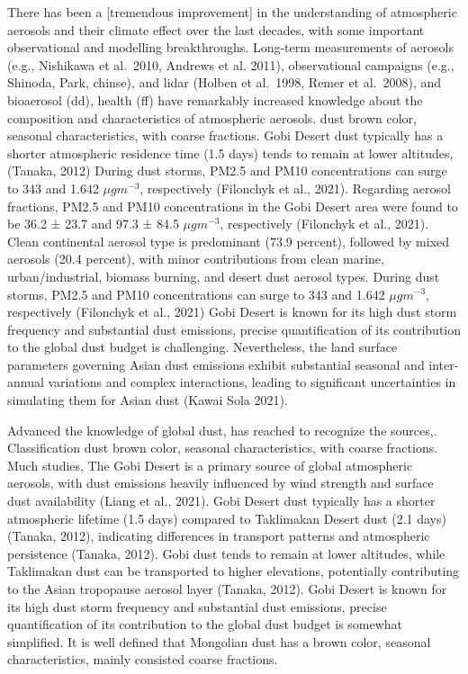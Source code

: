 \documentclass[
  11pt,
]{article}
\begin{document}
There has been a {[}tremendous improvement{]} in the understanding of
atmospheric aerosols and their climate effect over the last decades,
with some important observational and modelling breakthroughs. Long-term
measurements of aerosols (e.g., Nishikawa et al.~2010, Andrews et al.
2011), observational campaigns (e.g., Shinoda, Park, chinse), and lidar
(Holben et al.~1998, Remer et al.~2008), and bioaerosol (dd), health
(ff) have remarkably increased knowledge about the composition and
characteristics of atmospheric aerosols. dust brown color, seasonal
characteristics, with coarse fractions. Gobi Desert dust typically has a
shorter atmospheric residence time (1.5 days) tends to remain at lower
altitudes, (Tanaka, 2012) During dust storms, PM2.5 and PM10
concentrations can surge to 343 and 1.642 \(\mu g m^{-3}\), respectively
(Filonchyk et al., 2021). Regarding aerosol fractions, PM2.5 and PM10
concentrations in the Gobi Desert area were found to be 36.2 ± 23.7 and
97.3 ± 84.5 \(\mu g m^{-3}\), respectively (Filonchyk et al., 2021).
Clean continental aerosol type is predominant (73.9 percent), followed
by mixed aerosols (20.4 percent), with minor contributions from clean
marine, urban/industrial, biomass burning, and desert dust aerosol
types. During dust storms, PM2.5 and PM10 concentrations can surge to
343 and 1.642 \(\mu g m^{-3}\), respectively (Filonchyk et al., 2021)
Gobi Desert is known for its high dust storm frequency and substantial
dust emissions, precise quantification of its contribution to the global
dust budget is challenging. Nevertheless, the land surface parameters
governing Asian dust emissions exhibit substantial seasonal and
inter-annual variations and complex interactions, leading to significant
uncertainties in simulating them for Asian dust (Kawai Sola 2021).

Advanced the knowledge of global dust, has reached to recognize the
sources,. Classification dust brown color, seasonal characteristics,
with coarse fractions. Much studies, The Gobi Desert is a primary source
of global atmospheric aerosols, with dust emissions heavily influenced
by wind strength and surface dust availability (Liang et al., 2021).
Gobi Desert dust typically has a shorter atmospheric lifetime (1.5 days)
compared to Taklimakan Desert dust (2.1 days) (Tanaka, 2012), indicating
differences in transport patterns and atmospheric persistence (Tanaka,
2012). Gobi dust tends to remain at lower altitudes, while Taklimakan
dust can be transported to higher elevations, potentially contributing
to the Asian tropopause aerosol layer (Tanaka, 2012). Gobi Desert is
known for its high dust storm frequency and substantial dust emissions,
precise quantification of its contribution to the global dust budget is
somewhat simplified. It is well defined that Mongolian dust has a brown
color, seasonal characteristics, mainly consisted coarse fractions.
\end{document}
